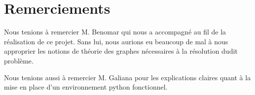 \documentclass[11pt, a4paper]{article}
\begin{document}
\section*{Remerciements}

Nous tenions à remercier M. Benomar qui nous a accompagné au fil de la réalisation de ce projet. Sans lui, nous aurions eu beaucoup de mal à nous approprier les notions de théorie des graphes nécessaires à la résolution dudit problème.

Nous tenions aussi à remercier M. Galiana pour les explications claires quant à la mise en place d'un environnement python fonctionnel.
\end{document}
